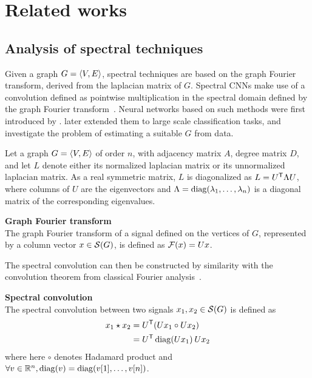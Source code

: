 \section{Related works}




\subsection{Analysis of spectral techniques}

Given a graph $\gve$, spectral techniques are based on the graph Fourier transform, derived from the laplacian matrix of $G$. Spectral CNNs make use of a convolution defined as pointwise multiplication in the spectral domain defined by the graph Fourier transform~\citep{chung1996spectral,shuman2013emerging}. Neural networks based on such methods were first introduced by \cite{bruna2013spectral}. \cite{henaff2015deep} later extended them to large scale classification tasks, and investigate the problem of estimating a suitable $G$ from data.

Let a graph $\gve$ of order $n$, with adjacency matrix $A$, degree matrix $D$, and let $L$ denote either its normalized laplacian matrix or its unnormalized laplacian matrix. As a real symmetric matrix, $L$ is diagonalized as $L = U^{\T} \Lambda U$, where columns of $U$ are the eigenvectors and $\Lambda = \diag(\lambda_1, \ldots , \lambda_n)$ is a diagonal matrix of the corresponding eigenvalues. 

\begin{definition}\textbf{Graph Fourier transform}\\
The graph Fourier transform of a signal defined on the vertices of $G$, represented by a column vector $x \in \cs(G)$, is defined as $\cf(x) = Ux$.
\end{definition}

The spectral convolution can then be constructed by similarity with the convolution theorem from classical Fourier analysis~\citep{wiki:conv}.

\begin{definition}\textbf{Spectral convolution}\\
The spectral convolution between two signals $x_1, x_2 \in \cs(G)$ is defined as
\begin{align*}
x_1 \star x_2 & = U^{\T}(Ux_1 \circ Ux_2)\\
 & = U^{\T} \diag(Ux_1) \h{2} Ux_2
\end{align*}
where here $\circ$ denotes Hadamard product and $\forall v \in \bbr^n, \diag(v) = \diag(v[1], \ldots, v[n])$.
\end{definition}

